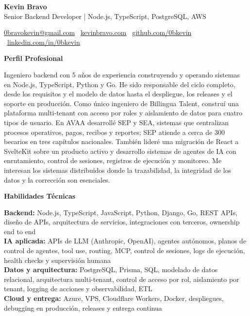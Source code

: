 \documentclass[11pt]{article}
\begin{document}
\begin{center}
    {\LARGE \textbf{Kevin Bravo}}\\
    Senior Backend Developer | Node.js, TypeScript, PostgreSQL, AWS \\
    \hrulefill
\end{center}

\begin{center}
    \href{mailto:0bravokevin@gmail.com}{0bravokevin@gmail.com}
    \textbullet\
    \href{https://kevinbravo.com}{kevinbravo.com}
    \textbullet\
    \href{https://github.com/0bkevin}{github.com/0bkevin}
    \textbullet\
    \href{https://www.linkedin.com/in/0bkevin/}{linkedin.com/in/0bkevin}
\end{center}

\vspace{4pt}
\begin{center}
    \textbf{Perfil Profesional}
\end{center}
\vspace{-4pt}
Ingeniero backend con 5 años de experiencia construyendo y operando sistemas en Node.js, TypeScript, Python y Go. He sido responsable del ciclo completo, desde los requisitos y el modelo de datos hasta el despliegue, los releases y el soporte en producción. Como único ingeniero de Billingua Talent, construí una plataforma multi-tenant con acceso por roles y aislamiento de datos para cuatro tipos de usuario. En AVAA desarrollé SEP y SEA, sistemas que centralizan procesos operativos, pagos, recibos y reportes; SEP atiende a cerca de 300 becarios en tres capítulos nacionales. También lideré una migración de React a SvelteKit sobre un producto activo y desarrollo sistemas de agentes de IA con enrutamiento, control de sesiones, registros de ejecución y monitoreo. Me interesan los sistemas distribuidos donde la trazabilidad, la integridad de los datos y la corrección son esenciales.

\vspace{8pt}
\begin{center}
    \textbf{Habilidades Técnicas}
\end{center}
\vspace{-4pt}
\textbf{Backend:} Node.js, TypeScript, JavaScript, Python, Django, Go, REST APIs, diseño de APIs, arquitectura de servicios, integraciones con terceros, ownership end to end \\
\textbf{IA aplicada:} APIs de LLM (Anthropic, OpenAI), agentes autónomos, planos de control de agentes, tool use, routing, MCP, control de sesiones, logs de ejecución, health checks y supervisión humana \\
\textbf{Datos y arquitectura:} PostgreSQL, Prisma, SQL, modelado de datos relacional, arquitectura multi-tenant, control de acceso por rol, aislamiento por tenant, logging de acciones y observabilidad, ETL \\
\textbf{Cloud y entrega:} Azure, VPS, Cloudflare Workers, Docker, despliegues, debugging en producción, releases y entrega continua
\end{document}
